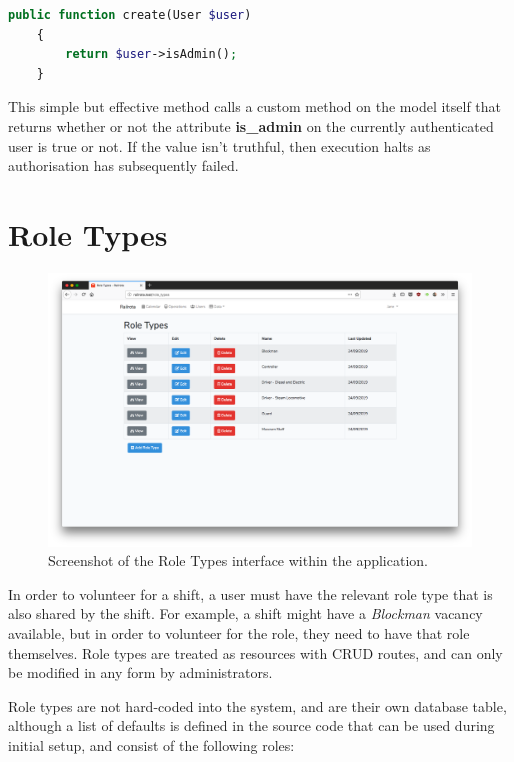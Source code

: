 \begin{lstlisting}[language=PHP, breaklines]
    public function create(User $user)
    {
        return $user->isAdmin();
    }
\end{lstlisting}

This simple but effective method calls a custom method on the model itself that returns whether or not the attribute \textbf{is\_admin} on the currently authenticated user is true or not. If the value isn't truthful, then execution halts as authorisation has subsequently failed.

\section{Role Types}

\begin{figure}[!ht]
    \centering
    \includegraphics[width=1.0\textwidth]{Figures/screenshot-roletypes}
    \caption{Screenshot of the Role Types interface within the application.}
    \label{fig:roletypes}
\end{figure}

In order to volunteer for a shift, a user must have the relevant role type that is also shared by the shift. For example, a shift might have a \textit{Blockman} vacancy available, but in order to volunteer for the role, they need to have that role themselves. Role types are treated as resources with CRUD routes, and can only be modified in any form by administrators.

Role types are not hard-coded into the system, and are their own database table, although a list of defaults is defined in the source code that can be used during initial setup, and consist of the following roles: 


